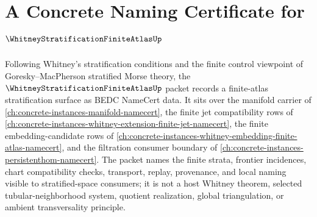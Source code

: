 \chapter{A Concrete Naming Certificate for $\WhitneyStratificationFiniteAtlasUp$}
\label{ch:concrete-instances-whitney-stratification-finite-atlas-namecert}

Following Whitney's stratification conditions and the finite control viewpoint of Goresky--MacPherson stratified Morse theory, the $\WhitneyStratificationFiniteAtlasUp$ packet records a finite-atlas stratification surface as BEDC NameCert data. It sits over the manifold carrier of \autoref{ch:concrete-instances-manifold-namecert}, the finite jet compatibility rows of \autoref{ch:concrete-instances-whitney-extension-finite-jet-namecert}, the finite embedding-candidate rows of \autoref{ch:concrete-instances-whitney-embedding-finite-atlas-namecert}, and the filtration consumer boundary of \autoref{ch:concrete-instances-persistenthom-namecert}. The packet names the finite strata, frontier incidences, chart compatibility checks, transport, replay, provenance, and local naming visible to stratified-space consumers; it is not a host Whitney theorem, selected tubular-neighborhood system, quotient realization, global triangulation, or ambient transversality principle.

